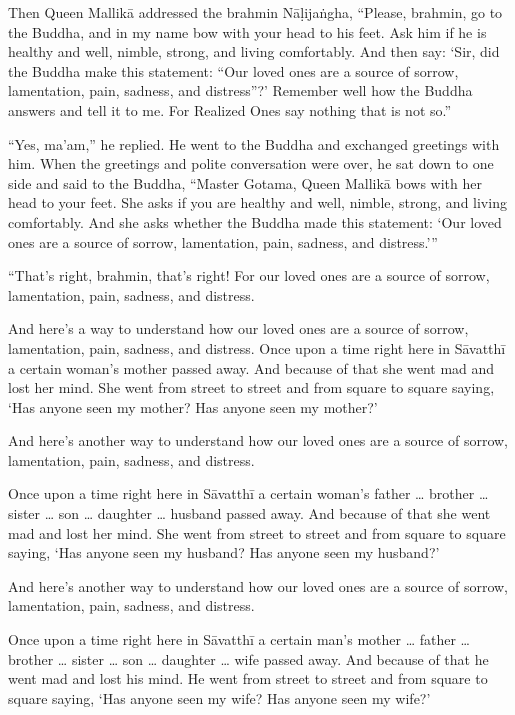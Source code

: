 \documentclass[12pt,openany]{book}%
\begin{document}
Then Queen \textsanskrit{Mallikā} addressed the brahmin \textsanskrit{Nāḷijaṅgha}, “Please, brahmin, go to the Buddha, and in my name bow with your head to his feet. Ask him if he is healthy and well, nimble, strong, and living comfortably. And then say: ‘Sir, did the Buddha make this statement: “Our loved ones are a source of sorrow, lamentation, pain, sadness, and distress”?’ Remember well how the Buddha answers and tell it to me. For Realized Ones say nothing that is not so.” 

“Yes, ma’am,” he replied. He went to the Buddha and exchanged greetings with him. When the greetings and polite conversation were over, he sat down to one side and said to the Buddha, “Master Gotama, Queen \textsanskrit{Mallikā} bows with her head to your feet. She asks if you are healthy and well, nimble, strong, and living comfortably. And she asks whether the Buddha made this statement: ‘Our loved ones are a source of sorrow, lamentation, pain, sadness, and distress.’” 

“That’s right, brahmin, that’s right! For our loved ones are a source of sorrow, lamentation, pain, sadness, and distress. 

And here’s a way to understand how our loved ones are a source of sorrow, lamentation, pain, sadness, and distress. Once upon a time right here in \textsanskrit{Sāvatthī} a certain woman’s mother passed away. And because of that she went mad and lost her mind. She went from street to street and from square to square saying, ‘Has anyone seen my mother? Has anyone seen my mother?’ 

And here’s another way to understand how our loved ones are a source of sorrow, lamentation, pain, sadness, and distress. 

Once upon a time right here in \textsanskrit{Sāvatthī} a certain woman’s father … brother … sister … son … daughter … husband passed away. And because of that she went mad and lost her mind. She went from street to street and from square to square saying, ‘Has anyone seen my husband? Has anyone seen my husband?’ 

And here’s another way to understand how our loved ones are a source of sorrow, lamentation, pain, sadness, and distress. 

Once upon a time right here in \textsanskrit{Sāvatthī} a certain man’s mother … father … brother … sister … son … daughter … wife passed away. And because of that he went mad and lost his mind. He went from street to street and from square to square saying, ‘Has anyone seen my wife? Has anyone seen my wife?’ 
\end{document}
